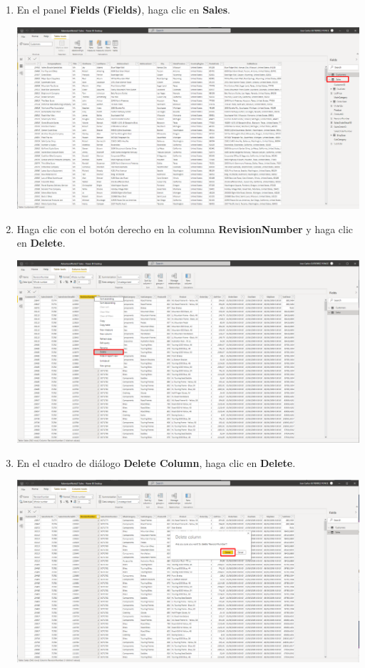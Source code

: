 \documentclass[12pt,letterpaper]{article}
\newcommand\tab[1][1cm]{\hspace*{#1}}
\begin{document}
\begin{enumerate}[\tab 1.]
\begin{center}
        \end{center}
        \item En el panel \textbf{Fields} \textbf{(Fields)}, haga clic en \textbf{Sales}.
        \begin{center}
            \includegraphics[width=13cm]{./img/img35.png}
        \end{center}
        \item Haga clic con el botón derecho en la columna \textbf{RevisionNumber} y haga clic en \textbf{Delete}.
        \begin{center}
            \includegraphics[width=13cm]{./img/img36.png}
        \end{center}
        \item En el cuadro de diálogo \textbf{Delete Column}, haga clic en \textbf{Delete}.
        \begin{center}
            \includegraphics[width=13cm]{./img/img37.png}

\end{center}
\end{enumerate}
\end{document}
